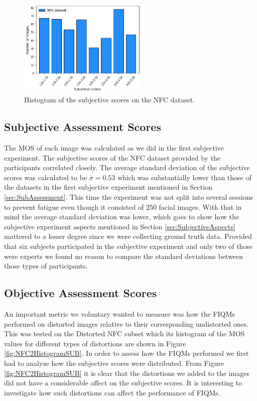 \begin{figure}[h]
    \centering
    \includegraphics[width=0.55\textwidth]{figures/NFC_Histogram.png}
    \caption{Histogram of the subjective scores on the NFC dataset.}
    \label{fig:NFCHistogram}
\end{figure}

\subsection{Subjective Assessment Scores}
The MOS of each image was calculated as we did in the first subjective experiment. The subjective scores of the NFC dataset provided by the participants correlated closely. The average standard deviation of the subjective scores was calculated to be $\overline{\sigma} = 0.53$ which was substantially lower than those of the datasets in the first subjective experiment mentioned in Section \ref{sec:SubAssessment}. This time the experiment was not split into several sessions to prevent fatigue even though it consisted of 250 facial images. With that in mind the average standard deviation was lower, which goes to show how the subjective experiment aspects mentioned in Section \ref{sec:SubjectiveAspects} mattered to a lesser degree since we were collecting ground truth data. Provided that six subjects participated in the subjective experiment and only two of those were experts we found no reason to compare the standard deviations between those types of participants.


\subsection{Objective Assessment Scores}
An important metric we voluntary wanted to measure was how the FIQMs performed on distorted images relative to their corresponding undistorted ones. This was tested on the Distorted NFC subset which its histogram of the MOS values for different types of distortions are shown in Figure \ref{fig:NFC2HistogramSUB}. 
In order to assess how the FIQMs performed we first had to analyze how the subjective scores were distributed. From Figure \ref{fig:NFC2HistogramSUB} it is clear that the distortions we added to the images did not have a considerable affect on the subjective scores. It is interesting to investigate how such distortions can affect the performance of FIQMs.

